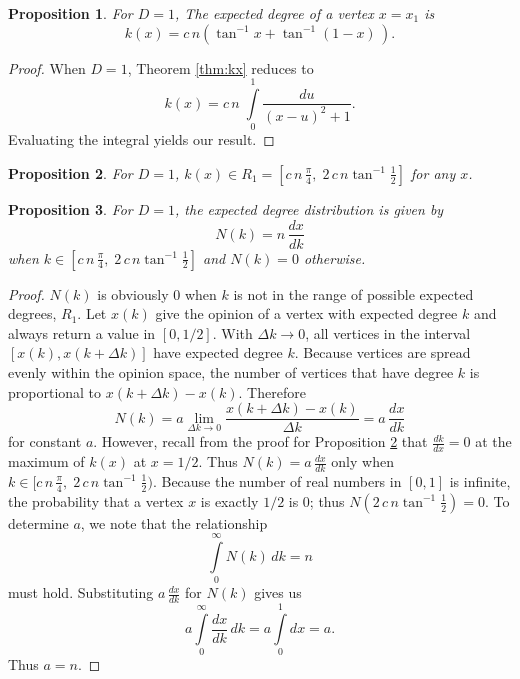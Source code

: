 \documentclass[a4paper,10pt]{article}
\newtheorem{prop}{Proposition}
\begin{document}
\begin{prop}
For $D = 1$, The expected degree of a vertex $x = x_1$ is
 \begin{equation}
 k(x) = c\,n\left(\tan^{-1} x + \tan^{-1} (1-x)\,\right).
\end{equation}
\end{prop}
\begin{proof}
When $D=1$, Theorem \ref{thm:kx} reduces to
\begin{equation}
 k(x) = c\,n\;\int\limits_{0}^{1} \frac{du}{(x - u)^2 + 1}.
\end{equation}
Evaluating the integral yields our result.
\end{proof}
\begin{prop}
\label{prop:R1}
 For $D=1$, $k(x) \in R_1 = [c\,n\,\frac{\pi}{4},\; 2\,c\,n \tan^{-1}\frac{1}{2}]$ for any $x$.
 \end{prop}

\begin{prop}
 For $D=1$, the expected degree distribution is given by
 \begin{equation}
  N(k) = n \,\frac{dx}{dk}
 \end{equation}
when $k \in [c\,n\,\frac{\pi}{4},\; 2\,c\,n \tan^{-1}\frac{1}{2}]$ and $N(k) = 0$ otherwise. \end{prop}
\begin{proof}
$N(k)$ is obviously 0 when $k$ is not in the range of possible expected degrees, $R_1$. Let $x(k)$ give the opinion of a vertex with expected degree $k$ and always return a value in $[0, 1/2]$. With $\Delta k \to 0$, all vertices in the interval $[x(k), x(k + \Delta k)]$ have expected degree $k$. Because vertices are spread evenly within the opinion space, the number of vertices that have degree $k$ is proportional to $x(k + \Delta k) - x(k)$. Therefore
\begin{equation}
 N(k) = a \lim\limits_{\Delta k \to 0} \frac{x(k + \Delta k) - x(k)}{\Delta k} = a \, \frac{dx}{dk}
\end{equation}
for constant $a$. However, recall from the proof for Proposition \ref{prop:R1} that $\frac{dk}{dx} = 0$ at the maximum of $k(x)$ at $x=1/2$. Thus $N(k) = a \, \frac{dx}{dk}$ only when $k \in  [c\,n\,\frac{\pi}{4},\; 2\,c\,n \tan^{-1}\frac{1}{2})$. Because the number of real numbers in $[0, 1]$ is infinite, the probability that a vertex $x$ is exactly $1/2$ is 0; thus $N(2\,c\,n \tan^{-1}\frac{1}{2}) = 0$. To determine $a$, we note that the relationship 
\begin{equation}
\label{eqn:Nsum}
 \int\limits_{0}^\infty N(k)\, dk = n
\end{equation}
must hold. Substituting $a \, \frac{dx}{dk}$ for $N(k)$ gives us 
\begin{equation}
 a\int\limits_{0}^\infty \frac{dx}{dk} \, dk = a\int\limits_{0}^1 dx = a.
\end{equation}
Thus $a = n$.
\end{proof}
\end{document}
